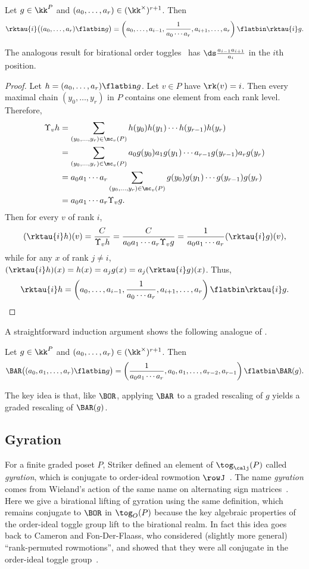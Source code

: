 \begin{prop}\label{prop:rank-tog-graded-rescaling}
Let $g\in\kk^P$ and $(a_0,\dots,a_r)\in(\kk^\times)^{r+1}$.
Then
\[
\rktau{i}\big( (a_0,\dots,a_r)\flatbin g \big)=
\left( a_0,\dots,a_{i-1},\frac{1}{a_0\cdots a_r},a_{i+1},\dots,a_r \right) \flatbin\rktau{i}g.
\]
\end{prop}
The analogous result for birational order toggles~\cite[Prop.~39]{GrRo16} has 
$\ds \frac{a_{i-1}a_{i+1}}{a_{i}}$ in the $i$th position. 
\begin{proof}
Let $h=(a_0,\dots,a_r)\flatbin g$. Let $v\in P$ have $\rk(v)=i$. Then every maximal chain
$(y_0,\dots,y_r)$ in $P$ contains one element from each rank level. Therefore, 
\begin{align*}
\Upsilon_v h &= \sum\limits_{(y_0,\dots,y_r)\in\mc_v(P)} h(y_0)h(y_1)\cdots h(y_{r-1}) h(y_r)\\
&= \sum\limits_{(y_0,\dots,y_r)\in\mc_v(P)} a_0 g(y_0) a_1 g(y_1)\cdots a_{r-1} g(y_{r-1}) a_r g(y_r)\\
&= a_0a_1\cdots a_r \sum\limits_{(y_0,\dots,y_r)\in\mc_v(P)} g(y_0) g(y_1)\cdots g(y_{r-1}) g(y_r)\\
&= a_0a_1\cdots a_r \Upsilon_v g.
\end{align*}
Then for every $v$ of rank $i$,
\[
(\rktau{i}h)(v)=\frac{C}{\Upsilon_v h}=\frac{C}{a_0a_1\cdots a_r \Upsilon_v g}
=\frac{1}{a_0a_1\cdots a_r}(\rktau{i}g)(v),
\] 
while for any $x$ of rank $j\not=i$,
$(\rktau{i}h)(x)=h(x)=a_j g(x) = a_j (\rktau{i}g)(x)$.
Thus, 
\[
\rktau{i}h = \left( a_0,\dots,a_{i-1},\frac{1}{a_0\cdots a_r},a_{i+1},\dots,a_r \right) \flatbin \rktau{i}g.\qedhere
\]
\end{proof}
A straightforward induction argument shows the following analogue of
\cite[Prop.~40]{GrRo16}. 
\begin{prop}\label{prop:BAR-graded-rescaling}
Let $g\in\kk^P$ and $(a_0,\dots,a_r)\in(\kk^\times)^{r+1}$.
Then
\[
\BAR\big( (a_0,a_1, \dots,a_r)\flatbin g \big)=
\left( \frac{1}{a_0 a_1\cdots a_r}, a_0, a_1, \dots, a_{r-2}, a_{r-1} \right) \flatbin\BAR(g).
\]
\end{prop}

The key idea is that, like $\BOR$, applying $\BAR$ to a graded rescaling of $g$ yields a graded
rescaling of $\BAR(g)$. 

\subsection{Gyration}

For a finite graded poset $P$, Striker defined an
element of $\tog_\calj(P)$ called \emph{gyration},
which is conjugate to order-ideal rowmotion
$\rowJ$~\cite[\S~6]{strikerRS}.
The name \emph{gyration} comes from Wieland's action of the same name on alternating sign matrices~\cite{wieland}. 
Here we give a birational lifting of gyration using the
same definition, which remains conjugate to
$\BOR$ in $\tog_O(P)$ because the key algebraic properties of the order-ideal toggle group lift
to the birational realm. In fact this idea goes back to Cameron and Fon-Der-Flaass,
who considered (slightly more general) ``rank-permuted rowmotions'', and showed that they
were all conjugate in the order-ideal toggle group~\cite[Lemma 2]{cameronfonder}.

